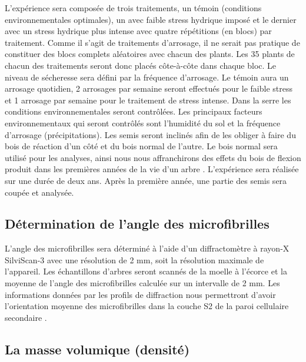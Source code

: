 \documentclass[a4paper,12pt]{report}
\begin{document}
L'expérience sera composée de trois traitements, un témoin (conditions environnementales optimales), un avec faible stress hydrique imposé et le dernier avec un stress hydrique plus intense avec quatre répétitions (en blocs) par traitement. Comme il s'agit de traitements d'arrosage, il ne serait pas pratique de constituer des blocs complets aléatoires avec chacun des plants. Les 35 plants de chacun des traitements seront donc placés côte-à-côte dans chaque bloc. Le niveau de sécheresse sera défini par la fréquence d'arrosage. Le témoin aura un arrosage quotidien, 2 arrosages par semaine seront effectués pour le faible stress et 1 arrosage par semaine pour le traitement de stress intense. Dans la serre les conditions environnementales seront contrôlées. Les principaux facteurs environnementaux qui seront contrôlés sont l'humidité du sol et la fréquence d'arrosage (précipitations). Les semis seront inclinés afin de les obliger à faire du bois de réaction d'un côté et du bois normal de l'autre. Le bois normal sera utilisé pour les analyses, ainsi nous nous affranchirons des effets du bois de flexion produit dans les premières années de la vie d'un arbre \citep{Telewski1989}. L'expérience sera réalisée sur une durée de deux ans. Après la première année, une partie des semis sera coupée et analysée.


\subsection*{Détermination de l'angle des microfibrilles}
L'angle des microfibrilles sera déterminé à l'aide d'un diffractomètre à rayon-X SilviScan-3 avec une résolution de 2 mm, soit la résolution maximale de l'appareil. Les échantillons d'arbres seront scannés de la moelle à l'écorce et la moyenne de l'angle des microfibrilles calculée sur un intervalle de 2 mm.
Les informations données par les profils de diffraction nous permettront d'avoir l'orientation moyenne des microfibrilles dans la couche S2 de la paroi cellulaire secondaire \citep{Evans1999}.

\subsection*{La masse volumique (densité)}
\end{document}
